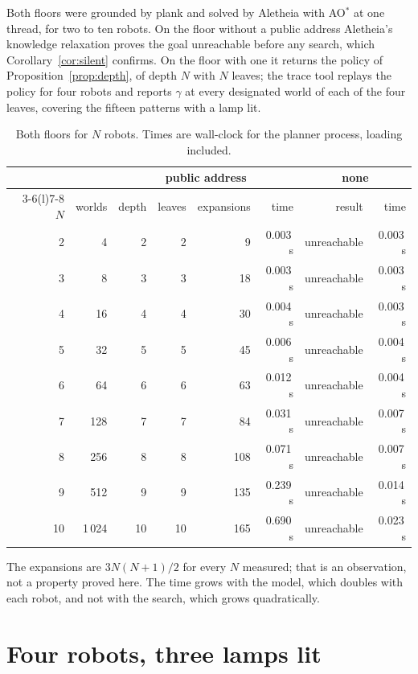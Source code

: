 \documentclass[11pt,a4paper]{article}
\theoremstyle{definition}
\begin{document}
Both floors were grounded by plank and solved by Aletheia with AO$^*$ at one
thread, for two to ten robots. On the floor without a public address
Aletheia's knowledge relaxation proves the goal unreachable before any search,
which Corollary~\ref{cor:silent} confirms. On the floor with one it returns
the policy of Proposition~\ref{prop:depth}, of depth $N$ with $N$ leaves; the
trace tool replays the policy for four robots and reports $\gamma$ at every
designated world of each of the four leaves, covering the fifteen patterns with
a lamp lit.

\begin{table}[H]
\centering\small
\caption{Both floors for $N$ robots. Times are wall-clock for the planner
process, loading included.}
\label{tab:planning}
\begin{tabular}{@{}r r r r r r r r@{}}
\toprule
& & \multicolumn{4}{c}{public address} & \multicolumn{2}{c}{none} \\
\cmidrule(lr){3-6}\cmidrule(l){7-8}
$N$ & worlds & depth & leaves & expansions & time & result & time \\
\midrule
2 & 4 & 2 & 2 & 9 & 0.003\,s & unreachable & 0.003\,s \\
3 & 8 & 3 & 3 & 18 & 0.003\,s & unreachable & 0.003\,s \\
4 & 16 & 4 & 4 & 30 & 0.004\,s & unreachable & 0.003\,s \\
5 & 32 & 5 & 5 & 45 & 0.006\,s & unreachable & 0.004\,s \\
6 & 64 & 6 & 6 & 63 & 0.012\,s & unreachable & 0.004\,s \\
7 & 128 & 7 & 7 & 84 & 0.031\,s & unreachable & 0.007\,s \\
8 & 256 & 8 & 8 & 108 & 0.071\,s & unreachable & 0.007\,s \\
9 & 512 & 9 & 9 & 135 & 0.239\,s & unreachable & 0.014\,s \\
10 & 1\,024 & 10 & 10 & 165 & 0.690\,s & unreachable & 0.023\,s \\
\bottomrule
\end{tabular}
\end{table}

\noindent
The expansions are $3N(N+1)/2$ for every $N$ measured; that is an observation,
not a property proved here. The time grows with the model, which doubles with
each robot, and not with the search, which grows quadratically.

\section{Four robots, three lamps lit}
\label{sec:trace}
\end{document}
